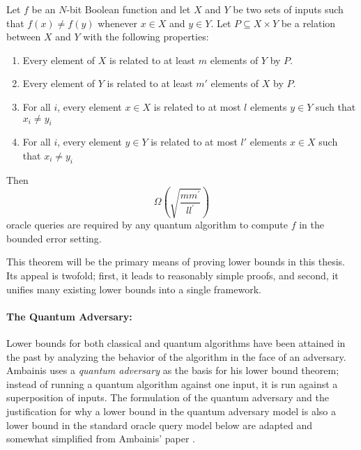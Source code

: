 \begin{theorem}[Ambainis]
\label{th:amb}
Let $f$ be an $N$-bit Boolean function and let $X$ and $Y$ be two sets
of inputs such that $f(x) \neq f(y)$ whenever $x \in X$ and $y \in Y$.
Let $P \subseteq X \times Y$ be a relation between $X$ and $Y$ with
the following properties:

\begin{enumerate}

\item
Every element of $X$ is related to at least $m$ elements of $Y$ by
$P$.

\item 
Every element of $Y$ is related to at least $m'$ elements of $X$ by
$P$.

\item 
For all $i$, every element $x \in X$ is related to at most $l$
elements $y \in Y$ such that $x_{i} \neq y_{i}$

\item 
For all $i$, every element $y \in Y$ is related to at most $l'$
elements $x \in X$ such that $x_{i} \neq y_{i}$

\end{enumerate}

Then
\[\Omega\left(\sqrt{\frac{mm^{\prime}}{ll^{\prime}}}\right)\] 
oracle queries are required by any quantum algorithm to compute $f$ in
the bounded error setting.
\end{theorem}

This theorem will be the primary means of proving lower bounds in this
thesis.  Its appeal is twofold; first, it leads to reasonably simple
proofs, and second, it unifies many existing lower bounds into a
single framework.

\paragraph{The Quantum Adversary:}

Lower bounds for both classical and quantum algorithms have been
attained in the past by analyzing the behavior of the algorithm in the
face of an adversary.  Ambainis uses a \emph{quantum adversary} as the
basis for his lower bound theorem; instead of running a quantum
algorithm against one input, it is run against a superposition of
inputs.  The formulation of the quantum adversary and the
justification for why a lower bound in the quantum adversary model is
also a lower bound in the standard oracle query model below are
adapted and somewhat simplified from Ambainis' paper
\cite{ambainis00quantum}.

